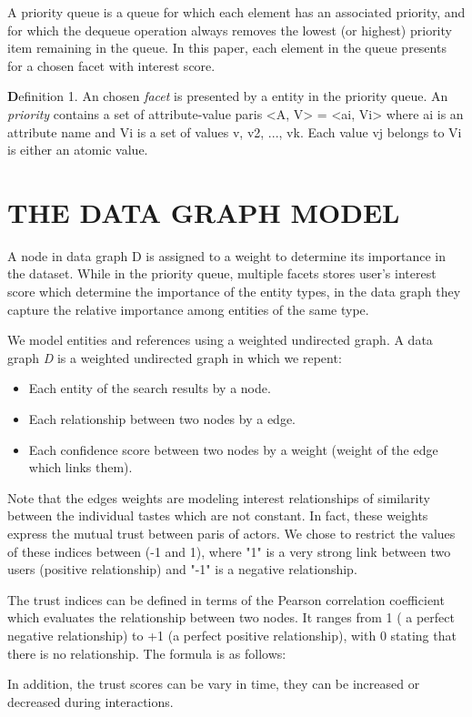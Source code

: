 A priority queue is a queue for which each element has an associated priority, and for which the dequeue operation always removes the lowest (or highest) priority item remaining in the queue. In this paper, each element in the queue presents for a chosen facet with interest score. 

{\textbf Definition 1.} An chosen {\it facet} is presented by a entity in the priority queue. An {\it priority} contains a set of attribute-value paris <A, V> = {<ai, Vi>} where ai is an attribute name and Vi is a set of values {v, v2, ..., vk}. Each value vj belongs to Vi is either an atomic value.

\section{THE DATA GRAPH MODEL}
A node in data graph D is assigned to a weight to determine its importance in the dataset. While in the priority queue, multiple facets stores user's interest score which determine the importance of the entity types, in the data graph they capture the relative importance among entities of the same type. 

We model entities and references using a weighted undirected graph. A data graph {\it D} is a weighted undirected graph in which we repent:
\begin{itemize}
	\item Each entity of the search results by a node.
	\item Each relationship between two nodes by a edge.
	\item Each confidence score between two nodes by a weight (weight of the edge which links them).
\end{itemize}
Note that the edges weights are modeling interest relationships of similarity between the individual tastes which are not constant. In fact, these weights express the mutual trust between paris of actors. We chose to restrict the values of these indices between (-1 and 1), where "1" is a very strong link between two users (positive relationship) and "-1" is a negative relationship.

The trust indices can be defined in terms of the Pearson correlation coefficient \cite{Leung2007} which evaluates the relationship between two nodes. It ranges from 1 ( a perfect negative relationship) to +1 (a perfect positive relationship), with 0 stating that there is no relationship. The formula is as follows:

In addition, the trust scores can be vary in time, they can be increased or decreased during interactions.